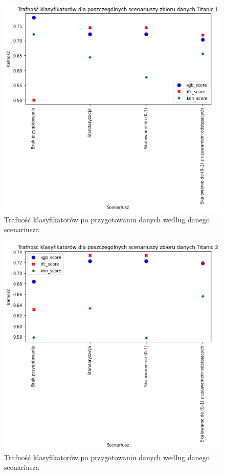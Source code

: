 \documentclass{book}
\begin{document}
\begin{figure}[H]
\centerline{\includegraphics{Titanic_1_Standaryzacja}}
\centering
\caption{Trafność klasyfikatorów po przygotowaniu danych 
według danego scenariusza}
\end{figure}

\begin{figure}[H]
\centerline{\includegraphics{Titanic_2_Standaryzacja}}
\centering
\caption{Trafność klasyfikatorów po przygotowaniu danych 
według danego scenariusza}
\end{figure}
\end{document}
